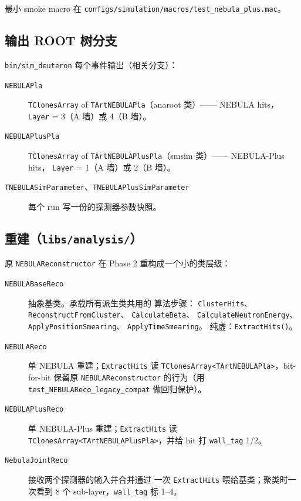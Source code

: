 \documentclass[a4paper,11pt]{ctexart}
\newcommand{\NEB}{NEBULA}
\newcommand{\NPL}{NEBULA-Plus}
\begin{document}
最小 smoke macro 在
\texttt{configs/simulation/macros/test\_nebula\_plus.mac}。

\subsection{输出 ROOT 树分支}

\texttt{bin/sim\_deuteron} 每个事件输出（相关分支）：

\begin{description}
  \item[\texttt{NEBULAPla}]     \texttt{TClonesArray} of
        \texttt{TArtNEBULAPla}（anaroot 类）—— \NEB{} hits，
        \texttt{Layer} = 3（A 墙）或 4（B 墙）。
  \item[\texttt{NEBULAPlusPla}] \texttt{TClonesArray} of
        \texttt{TArtNEBULAPlusPla}（smsim 类）—— \NPL{} hits，
        \texttt{Layer} = 1（A 墙）或 2（B 墙）。
  \item[\texttt{TNEBULASimParameter}、\texttt{TNEBULAPlusSimParameter}]
        每个 run 写一份的探测器参数快照。
\end{description}

\subsection{重建（\texttt{libs/analysis/}）}

原 \texttt{NEBULAReconstructor} 在 Phase 2 重构成一个小的类层级：

\begin{description}
  \item[\texttt{NEBULABaseReco}] 抽象基类。承载所有派生类共用的
        算法步骤：
        \texttt{ClusterHits}、
        \texttt{ReconstructFromCluster}、
        \texttt{CalculateBeta}、
        \texttt{CalculateNeutronEnergy}、
        \texttt{ApplyPositionSmearing}、
        \texttt{ApplyTimeSmearing}。
        纯虚：\texttt{ExtractHits()}。
  \item[\texttt{NEBULAReco}] 单 \NEB{} 重建；\texttt{ExtractHits}
        读 \texttt{TClonesArray<TArtNEBULAPla>}，bit-for-bit 保留原
        \texttt{NEBULAReconstructor} 的行为（用
        \texttt{test\_NEBULAReco\_legacy\_compat} 做回归保护）。
  \item[\texttt{NEBULAPlusReco}] 单 \NPL{} 重建；\texttt{ExtractHits}
        读 \texttt{TClonesArray<TArtNEBULAPlusPla>}，并给
        hit 打 \texttt{wall\_tag} 1/2。
  \item[\texttt{NebulaJointReco}] 接收两个探测器的输入并合并通过
        一次 \texttt{ExtractHits} 喂给基类；聚类时一次看到
        8 个 sub-layer，\texttt{wall\_tag} 标 1--4。
\end{description}
\end{document}
